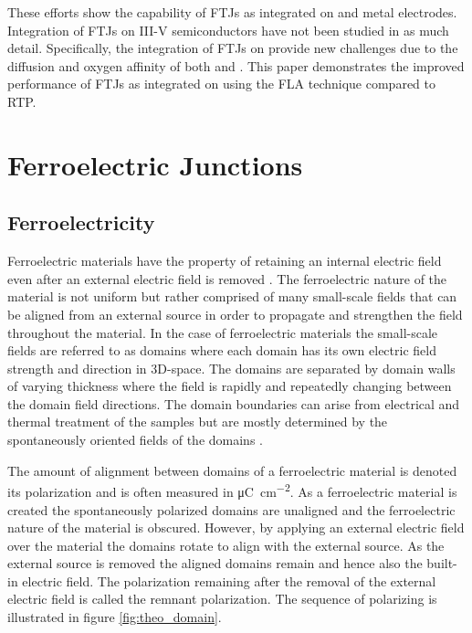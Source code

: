 \documentclass[11pt,twoside]{eitExjobb}
\begin{document}
These efforts show the capability of FTJs as integrated on  and metal
electrodes. Integration of FTJs on III-V semiconductors have not been studied
in as much detail. Specifically, the integration of FTJs on  provide
new challenges due to the diffusion and oxygen affinity of both  and
 \cite{kang2016structural}. This paper demonstrates the improved
performance of FTJs as integrated on  using the FLA technique compared
to RTP.
    
\chapter{Ferroelectric Junctions}\label{ch:ferro}

\section{Ferroelectricity}\label{sec:ferro}

Ferroelectric materials have the property of retaining an internal electric
field even after an external electric field is removed
\cite{dawber2005physics}. The ferroelectric nature of the material is not
uniform but rather comprised of many small-scale fields that can be aligned
from an external source in order to propagate and strengthen the field
throughout the material. In the case of ferroelectric materials the small-scale
fields are referred to as domains where each domain has its own electric field
strength and direction in 3D-space. The domains are separated by domain walls
of varying thickness where the field is rapidly and repeatedly changing between
the domain field directions. The domain boundaries can arise from electrical
and thermal treatment of the samples but are mostly determined by the
spontaneously oriented fields of the domains \cite{damjanovic2006hysteresis}.

The amount of alignment between domains of a ferroelectric material is denoted
its polarization and is often measured in
\si{\micro\coulomb\per\centi\meter\squared}. As a ferroelectric material is
created the spontaneously polarized domains are unaligned and the ferroelectric
nature of the material is obscured. However, by applying an external electric
field over the material the domains rotate to align with the external source.
As the external source is removed the aligned domains remain and hence also the
built-in electric field. The polarization remaining after the removal of the
external electric field is called the remnant polarization. The sequence of
polarizing is illustrated in figure \ref{fig:theo_domain}.
\end{document}
